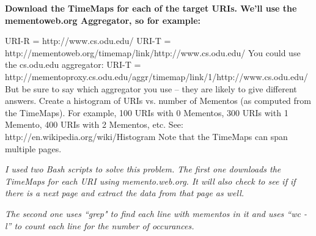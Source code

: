 \documentclass{article}
\begin{document}
{\bf Download the TimeMaps for each of the target URIs.  We'll use the mementoweb.org \newline
Aggregator, so for example:\newline\newline

URI-R = http://www.cs.odu.edu/
\newline
URI-T = http://mementoweb.org/timemap/link/http://www.cs.odu.edu/
\newline
You could use the cs.odu.edu aggregator:
\newline
URI-T = http://mementoproxy.cs.odu.edu/aggr/timemap/link/1/http://www.cs.odu.edu/
\newline\newline
But be sure to say which aggregator you use -- they are likely to give different answers.
\newline
Create a histogram of URIs vs. number of Mementos (as computed from the TimeMaps).  For example, 100 URIs with 0 Mementos, 300 URIs with 1 Memento, 400 URIs with 2 Mementos, etc.
\newline\newline
See: http://en.wikipedia.org/wiki/Histogram
\newline
Note that the TimeMaps can span multiple pages.  
\newline\newline
} 

{\it I used two Bash scripts to solve this problem. \newline\newline
The first one downloads the TimeMaps for each URI using memento.web.org.  It will also check to see if if there is a next page and extract the data from that page as well.  
\newline
}



{\it 
The second one uses ``grep" to find each line with mementos in it and uses ``wc -l'' to count each line for the number of occurances.  
\newline
}


\end{document}
